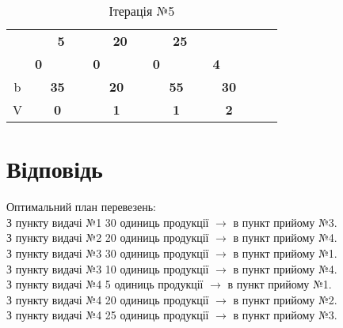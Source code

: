 \documentclass[a4paper, 12pt]{article}
\begin{document}
\begin{table}[H]
\begin{tabular}{|c|cccc|cccc|cccc|cccc|rr|}
\cline{5-5}\cline{9-9}\cline{13-13}\cline{17-17}          &       & \multicolumn{2}{c}{\multirow{2}[2]{*}{\textbf{5}}} &       &       & \multicolumn{2}{c}{\multirow{2}[2]{*}{\textbf{20}}} &       &       & \multicolumn{2}{c}{\multirow{2}[2]{*}{\textbf{25}}} &       &       & \multicolumn{2}{c}{\multirow{2}[2]{*}{}} &       & \multicolumn{1}{c|}{} &  \bigstrut[t]\\
          &       & \multicolumn{2}{c}{} &       &       & \multicolumn{2}{c}{} &       &       & \multicolumn{2}{c}{} &       &       & \multicolumn{2}{c}{} &       & \multicolumn{1}{c|}{} &  \bigstrut[b]\\
\cline{2-2}\cline{6-6}\cline{10-10}\cline{14-14}          & \multicolumn{1}{c|}{\textbf{0}} &       &       &       & \multicolumn{1}{c|}{\textbf{0}} & \multicolumn{2}{c}{} &       & \multicolumn{1}{c|}{\textbf{0}} &       &       &       & \multicolumn{1}{c|}{\textbf{4}} & \multicolumn{2}{c}{} &       & \multicolumn{1}{c|}{} &  \bigstrut\\
    \hline
    b     & \multicolumn{4}{c|}{\textbf{35}} & \multicolumn{4}{c|}{\textbf{20}} & \multicolumn{4}{c|}{\textbf{55}} & \multicolumn{4}{c|}{\textbf{30}} &       &  \bigstrut\\
\cline{1-17}    V     & \multicolumn{4}{c|}{\textbf{0}} & \multicolumn{4}{c|}{\textbf{1}} & \multicolumn{4}{c|}{\textbf{1}} & \multicolumn{4}{c|}{\textbf{2}} &       &  \bigstrut\\
    \hline
    \end{tabular}%
  \caption{Ітерація №5}
  \label{tab:it4}%
\end{table}%

\newpage
\section{Відповідь}
Оптимальний план перевезень:\\
З пункту видачі №1 30 одиниць продукції $\longrightarrow$ в пункт прийому №3.\\
З пункту видачі №2 20 одиниць продукції $\longrightarrow$ в пункт прийому №4.\\
З пункту видачі №3 30 одиниць продукції $\longrightarrow$ в пункт прийому №1.\\
З пункту видачі №3 10 одиниць продукції $\longrightarrow$ в пункт прийому №4.\\
З пункту видачі №4 5 одиниць продукції $\longrightarrow$ в пункт прийому №1.\\
З пункту видачі №4 20 одиниць продукції $\longrightarrow$ в пункт прийому №2.\\
З пункту видачі №4 25 одиниць продукції $\longrightarrow$ в пункт прийому №3.\\
\end{document}

